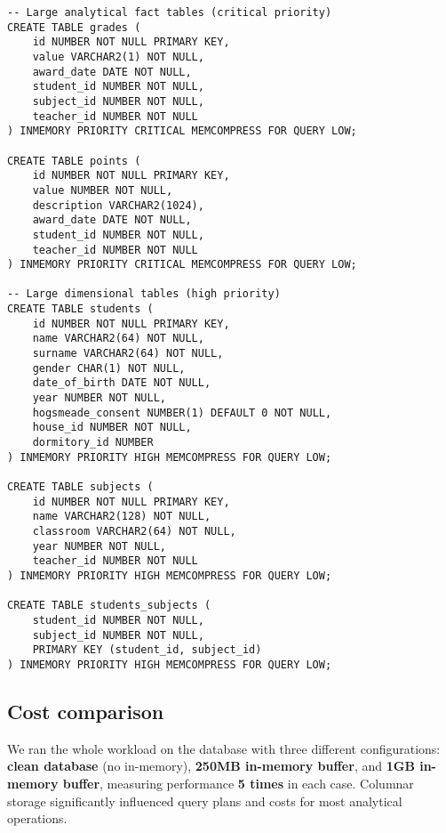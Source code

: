 \begin{lstlisting}
-- Large analytical fact tables (critical priority)
CREATE TABLE grades (
    id NUMBER NOT NULL PRIMARY KEY,
    value VARCHAR2(1) NOT NULL,
    award_date DATE NOT NULL,
    student_id NUMBER NOT NULL,
    subject_id NUMBER NOT NULL,
    teacher_id NUMBER NOT NULL
) INMEMORY PRIORITY CRITICAL MEMCOMPRESS FOR QUERY LOW;

CREATE TABLE points (
    id NUMBER NOT NULL PRIMARY KEY,
    value NUMBER NOT NULL,
    description VARCHAR2(1024),
    award_date DATE NOT NULL,
    student_id NUMBER NOT NULL,
    teacher_id NUMBER NOT NULL
) INMEMORY PRIORITY CRITICAL MEMCOMPRESS FOR QUERY LOW;

-- Large dimensional tables (high priority)
CREATE TABLE students (
    id NUMBER NOT NULL PRIMARY KEY,
    name VARCHAR2(64) NOT NULL,
    surname VARCHAR2(64) NOT NULL,
    gender CHAR(1) NOT NULL,
    date_of_birth DATE NOT NULL,
    year NUMBER NOT NULL,
    hogsmeade_consent NUMBER(1) DEFAULT 0 NOT NULL,
    house_id NUMBER NOT NULL,
    dormitory_id NUMBER
) INMEMORY PRIORITY HIGH MEMCOMPRESS FOR QUERY LOW;

CREATE TABLE subjects (
    id NUMBER NOT NULL PRIMARY KEY,
    name VARCHAR2(128) NOT NULL,
    classroom VARCHAR2(64) NOT NULL,
    year NUMBER NOT NULL,
    teacher_id NUMBER NOT NULL
) INMEMORY PRIORITY HIGH MEMCOMPRESS FOR QUERY LOW;

CREATE TABLE students_subjects (
    student_id NUMBER NOT NULL,
    subject_id NUMBER NOT NULL,
    PRIMARY KEY (student_id, subject_id)
) INMEMORY PRIORITY HIGH MEMCOMPRESS FOR QUERY LOW;
\end{lstlisting}

\subsection{Cost comparison}
We ran the whole workload on the database with three different configurations: \textbf{clean database} (no in-memory), \textbf{250MB in-memory buffer}, and \textbf{1GB in-memory buffer}, measuring performance \textbf{5 times} in each case. Columnar storage significantly influenced query plans and costs for most analytical operations.

